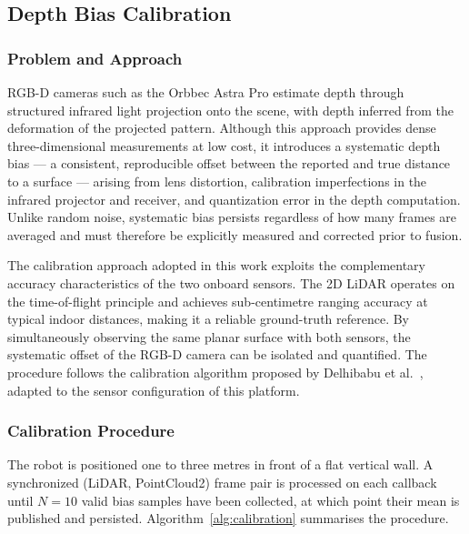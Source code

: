 \subsection{Depth Bias Calibration}

\subsubsection{Problem and Approach}

RGB-D cameras such as the Orbbec Astra Pro estimate depth through
structured infrared light projection onto the scene, with depth inferred
from the deformation of the projected pattern. Although this approach
provides dense three-dimensional measurements at low cost, it introduces
a systematic depth bias — a consistent, reproducible offset between the
reported and true distance to a surface — arising from lens distortion,
calibration imperfections in the infrared projector and receiver, and
quantization error in the depth computation. Unlike random noise,
systematic bias persists regardless of how many frames are averaged and
must therefore be explicitly measured and corrected prior to fusion.

The calibration approach adopted in this work exploits the
complementary accuracy characteristics of the two onboard sensors.
The 2D LiDAR operates on the time-of-flight principle and achieves
sub-centimetre ranging accuracy at typical indoor distances, making it
a reliable ground-truth reference. By simultaneously observing the
same planar surface with both sensors, the systematic offset of the
RGB-D camera can be isolated and quantified. The procedure follows the
calibration algorithm proposed by Delhibabu et al.~\cite{delhibabu2026},
adapted to the sensor configuration of this platform.

\subsubsection{Calibration Procedure}

The robot is positioned one to three metres in front of a flat
vertical wall. A synchronized (LiDAR, PointCloud2) frame pair is
processed on each callback until $N = 10$ valid bias samples have
been collected, at which point their mean is published and persisted.
Algorithm~\ref{alg:calibration} summarises the procedure.

